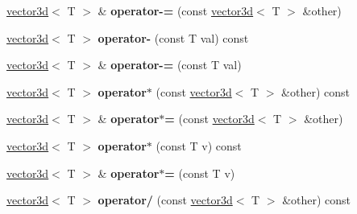 \begin{DoxyCompactItemize}
\item 
\hyperlink{classirr_1_1core_1_1vector3d}{vector3d}$<$ T $>$ \& {\bfseries operator-\/=} (const \hyperlink{classirr_1_1core_1_1vector3d}{vector3d}$<$ T $>$ \&other)\hypertarget{classirr_1_1core_1_1vector3d_a91a4a39544340b3d02e81659f1a0b7d2}{}\label{classirr_1_1core_1_1vector3d_a91a4a39544340b3d02e81659f1a0b7d2}

\item 
\hyperlink{classirr_1_1core_1_1vector3d}{vector3d}$<$ T $>$ {\bfseries operator-\/} (const T val) const \hypertarget{classirr_1_1core_1_1vector3d_a4c9b7154c6d582cd49039bd4f61c48cb}{}\label{classirr_1_1core_1_1vector3d_a4c9b7154c6d582cd49039bd4f61c48cb}

\item 
\hyperlink{classirr_1_1core_1_1vector3d}{vector3d}$<$ T $>$ \& {\bfseries operator-\/=} (const T val)\hypertarget{classirr_1_1core_1_1vector3d_afe666e30d5e903d4d910f2544829233c}{}\label{classirr_1_1core_1_1vector3d_afe666e30d5e903d4d910f2544829233c}

\item 
\hyperlink{classirr_1_1core_1_1vector3d}{vector3d}$<$ T $>$ {\bfseries operator$\ast$} (const \hyperlink{classirr_1_1core_1_1vector3d}{vector3d}$<$ T $>$ \&other) const \hypertarget{classirr_1_1core_1_1vector3d_aab7ded0a282f23cdc75533873f41dee5}{}\label{classirr_1_1core_1_1vector3d_aab7ded0a282f23cdc75533873f41dee5}

\item 
\hyperlink{classirr_1_1core_1_1vector3d}{vector3d}$<$ T $>$ \& {\bfseries operator$\ast$=} (const \hyperlink{classirr_1_1core_1_1vector3d}{vector3d}$<$ T $>$ \&other)\hypertarget{classirr_1_1core_1_1vector3d_a04e89643ddbd6e17ffceffd64e740760}{}\label{classirr_1_1core_1_1vector3d_a04e89643ddbd6e17ffceffd64e740760}

\item 
\hyperlink{classirr_1_1core_1_1vector3d}{vector3d}$<$ T $>$ {\bfseries operator$\ast$} (const T v) const \hypertarget{classirr_1_1core_1_1vector3d_ae8ecbd713bd488d45eab406f34679c1c}{}\label{classirr_1_1core_1_1vector3d_ae8ecbd713bd488d45eab406f34679c1c}

\item 
\hyperlink{classirr_1_1core_1_1vector3d}{vector3d}$<$ T $>$ \& {\bfseries operator$\ast$=} (const T v)\hypertarget{classirr_1_1core_1_1vector3d_a588d293d4d3ebd95240a9d2b46072233}{}\label{classirr_1_1core_1_1vector3d_a588d293d4d3ebd95240a9d2b46072233}

\item 
\hyperlink{classirr_1_1core_1_1vector3d}{vector3d}$<$ T $>$ {\bfseries operator/} (const \hyperlink{classirr_1_1core_1_1vector3d}{vector3d}$<$ T $>$ \&other) const \hypertarget{classirr_1_1core_1_1vector3d_a82f734747a8d460a73482dc69a1d2ece}{}\label{classirr_1_1core_1_1vector3d_a82f734747a8d460a73482dc69a1d2ece}


\end{DoxyCompactItemize}

